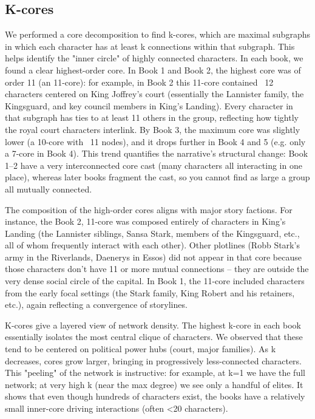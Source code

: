 \documentclass[12pt, a4paper]{article}
\begin{document}
\subsection*{K-cores}

We performed a core decomposition to find k-cores, which are maximal subgraphs in which each character has at least k connections within that subgraph. This helps identify the "inner circle" of highly connected characters. In each book, we found a clear highest-order core. In Book 1 and Book 2, the highest core was of order 11 (an 11-core): for example, in Book 2 this 11-core contained ~12 characters centered on King Joffrey's court (essentially the Lannister family, the Kingsguard, and key council members in King's Landing). Every character in that subgraph has ties to at least 11 others in the group, reflecting how tightly the royal court characters interlink. By Book 3, the maximum core was slightly lower (a 10-core with ~11 nodes), and it drops further in Book 4 and 5 (e.g. only a 7-core in Book 4). This trend quantifies the narrative's structural change: Book 1–2 have a very interconnected core cast (many characters all interacting in one place), whereas later books fragment the cast, so you cannot find as large a group all mutually connected. 

The composition of the high-order cores aligns with major story factions. For instance, the Book 2, 11-core was composed entirely of characters in King's Landing (the Lannister siblings, Sansa Stark, members of the Kingsguard, etc., all of whom frequently interact with each other). Other plotlines (Robb Stark's army in the Riverlands, Daenerys in Essos) did not appear in that core because those characters don't have 11 or more mutual connections – they are outside the very dense social circle of the capital. In Book 1, the 11-core included characters from the early focal settings (the Stark family, King Robert and his retainers, etc.), again reflecting a convergence of storylines. 

K-cores give a layered view of network density. The highest k-core in each book essentially isolates the most central clique of characters. We observed that these tend to be centered on political power hubs (court, major families). As k decreases, cores grow larger, bringing in progressively less-connected characters. This "peeling" of the network is instructive: for example, at k=1 we have the full network; at very high k (near the max degree) we see only a handful of elites. It shows that even though hundreds of characters exist, the books have a relatively small inner-core driving interactions (often <20 characters).
\end{document}
